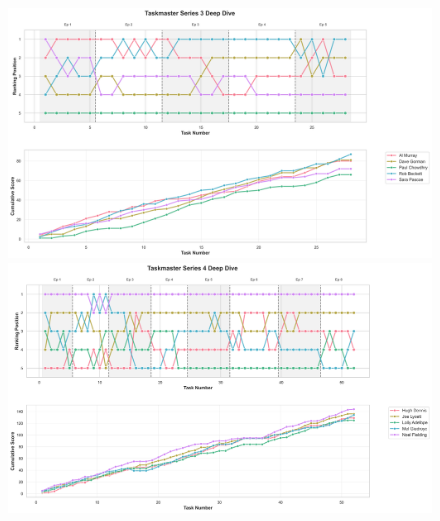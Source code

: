 \documentclass[10pt,letterpaper]{article}
\begin{document}
\begin{figure}[!h]
\centering
\includegraphics[width=\linewidth]{figures/supplementary/series_3_deep_dive.png}
\includegraphics[width=\linewidth]{figures/supplementary/series_4_deep_dive.png}
\end{figure}
\FloatBarrier
\clearpage
\end{document}
